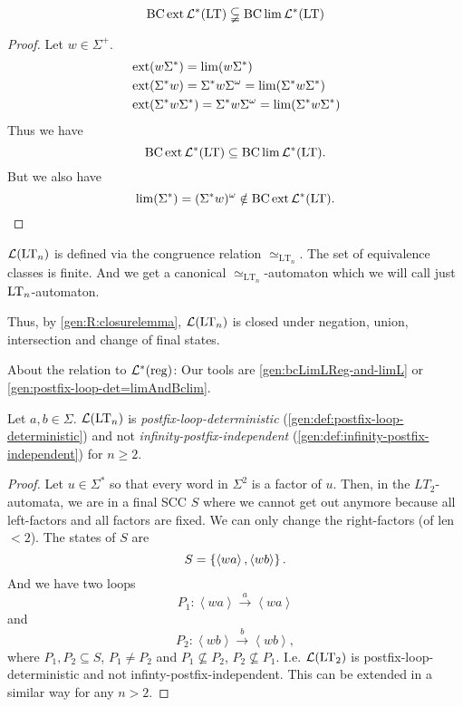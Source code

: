 \begin{theorem}
\[ \operatorname{BC} \operatorname{ext} \mathcal{L}^* (\textup{\textrm{LT}}) \subsetneqq \operatorname{BC} \lim \mathcal{L}^*(\textup{\textrm{LT}})  \]

\begin{proof}
Let $w \in \Sigma^+$.
\begin{align*}
& \operatorname{ext} (w \Sigma^*) = \lim(w \Sigma^*) \\
& \operatorname{ext}( \Sigma^* w) = \Sigma^* w \Sigma^\omega = \lim( \Sigma^* w \Sigma^* ) \\
& \operatorname{ext}( \Sigma^* w \Sigma^*) = \Sigma^* w \Sigma^\omega = \lim( \Sigma^* w \Sigma^* )
\end{align*}
Thus we have
\[ \operatorname{BC} \operatorname{ext} \mathcal{L}^* (\textup{\textrm{LT}}) \subseteq \operatorname{BC} \lim \mathcal{L}^*(\textup{\textrm{LT}}) . \]
But we also have
\[ \lim(\Sigma^*) = (\Sigma^* w)^\omega \notin \operatorname{BC} \operatorname{ext} \mathcal{L}^* (\textup{\textrm{LT}}) . \]
\end{proof}
\end{theorem}

$\mathcal{L}(\textup{\textrm{LT}}_n)$ is defined via the congruence relation $\simeq_{\text{LT}_n}$. The set of equivalence classes is finite. And we get a canonical $\simeq_{\text{LT}_n}$-automaton which we will call just $\textup{\textrm{LT}}_n$-automaton.

Thus, by \cref{gen:R:closurelemma}, $\mathcal{L}(\textup{\textrm{LT}}_n)$ is closed under negation, union, intersection and change of final states.


About the relation to $\mathcal{L}^*(\textup{\textrm{reg}})$: Our tools are \cref{gen:bcLimLReg-and-limL} or \cref{gen:postfix-loop-det=limAndBclim}.
\begin{lemma}
Let $a,b \in \Sigma$. $\mathcal{L}(\textup{\textrm{LT}}_n)$ is \emph{postfix-loop-deterministic} (\cref{gen:def:postfix-loop-deterministic}) and not \emph{infinity-postfix-independent} (\cref{gen:def:infinity-postfix-independent}) for $n \ge 2$.
\begin{proof}
Let $u \in \Sigma^*$ so that every word in $\Sigma^2$ is a factor of $u$. Then, in the $LT_2$-automata, we are in a final SCC $S$ where we cannot get out anymore because all left-factors and all factors are fixed. We can only change the right-factors (of len $<2$). The states of $S$ are
\[ S = \Set{\left< wa \right>, \left< wb \right>} . \]
And we have two loops
\[ P_1 : \left< wa \right> \xrightarrow{a} \left< wa \right> \]
and
\[ P_2 : \left< wb \right> \xrightarrow{b} \left< wb \right> , \]
where $P_1,P_2 \subseteq S$, $P_1 \ne P_2$ and $P_1 \not\subseteq P_2$, $P_2 \not\subseteq P_1$. I.e. $\mathcal{L}(\textup{\textrm{LT}}_2)$ is postfix-loop-deterministic and not infinty-postfix-independent.
This can be extended in a similar way for any $n > 2$.
\end{proof}
\end{lemma}

